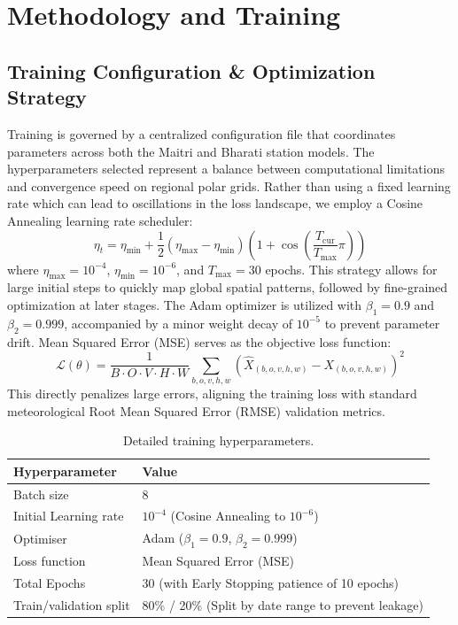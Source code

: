 \documentclass[12pt,titlepage,a4paper]{report}
\begin{document}
\chapter{Methodology and Training}
\section{Training Configuration \& Optimization Strategy}
Training is governed by a centralized configuration file that coordinates parameters across both the Maitri and Bharati station models. The hyperparameters selected represent a balance between computational limitations and convergence speed on regional polar grids. Rather than using a fixed learning rate which can lead to oscillations in the loss landscape, we employ a Cosine Annealing learning rate scheduler:
\begin{equation}
    \eta_t = \eta_{\text{min}} + \frac{1}{2}(\eta_{\text{max}} - \eta_{\text{min}})\left(1 + \cos\left(\frac{T_{\text{cur}}}{T_{\text{max}}}\pi\right)\right)
\end{equation}
where $\eta_{\text{max}} = 10^{-4}$, $\eta_{\text{min}} = 10^{-6}$, and $T_{\text{max}} = 30$ epochs. This strategy allows for large initial steps to quickly map global spatial patterns, followed by fine-grained optimization at later stages. The Adam optimizer is utilized with $\beta_1 = 0.9$ and $\beta_2 = 0.999$, accompanied by a minor weight decay of $10^{-5}$ to prevent parameter drift. Mean Squared Error (MSE) serves as the objective loss function:
\begin{equation}
    \mathcal{L}(\theta) = \frac{1}{B \cdot O \cdot V \cdot H \cdot W} \sum_{b,o,v,h,w} \left( \hat{X}_{(b,o,v,h,w)} - X_{(b,o,v,h,w)} \right)^2
\end{equation}
This directly penalizes large errors, aligning the training loss with standard meteorological Root Mean Squared Error (RMSE) validation metrics.

\begin{table}[H]
\centering
\begin{tabular}{ll}
    \toprule
    \textbf{Hyperparameter} & \textbf{Value} \\
    \midrule
    Batch size & 8 \\
    Initial Learning rate & $10^{-4}$ (Cosine Annealing to $10^{-6}$) \\
    Optimiser & Adam ($\beta_1=0.9$, $\beta_2=0.999$) \\
    Loss function & Mean Squared Error (MSE) \\
    Total Epochs & 30 (with Early Stopping patience of 10 epochs) \\
    Train/validation split & 80\% / 20\% (Split by date range to prevent leakage) \\
    \bottomrule
\end{tabular}
\caption{Detailed training hyperparameters.}
\label{tab:train_hyper_detail}
\end{table}
\end{document}
